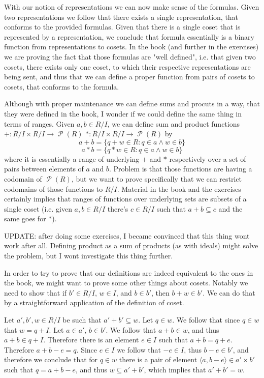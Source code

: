 \documentclass[11pt,oneside,titlepage]{book}
\DeclareMathOperator \pow {\mathcal {P}}
\newcommand{\eangle}[1]{\langle #1 \rangle}
\newcommand{\set}[1]{\{ #1 \}}
\begin{document}
With our notion of representations we can now make sense of the
formulas. Given two representations we follow that there exists a
single representation, that conforms to the provided formulas. Given
that there is a single coset that is represented by a representation,
we conclude that formula essentially is a binary function from
representations to cosets. In the book (and further in the exercises)
we are proving the fact that those formulas are "well defined",
i.e. that given two cosets, there exists only one coset, to which
their respective representations are being sent, and thus that we can
define a proper function from pairs of cosets to cosets, that conforms
to the formula.

Although with proper maintenance we can define sums and procuts
in a way, that they were defined in the book, I wonder if we could
define the same thing in terms of ranges. 
Given $a, b \in R/I$, we can define sum and
product functions $+: R/I \times R/I \to \pow(R)$
$*: R/I \times R/I \to \pow(R)$ by
$$a + b = \set{q + w \in R: q \in a \land w \in b}$$
$$a * b = \set{q * w \in R: q \in a \land w \in b}$$
where it is essentially a range of underlying $+$ and $*$ respectively
over a set of pairs between elements of $a$ and $b$. Problem is that
those functions are having a codomain of $\pow(R)$, but we want to
prove specifically that we can restrict codomains of those functions
to $R/I$. Material in the book and the exercises certainly implies
that ranges of functions over underlying sets are subsets of
a single coset (i.e. given $a, b \in R/I$ there's $c \in R/I$
such that $a + b \subseteq c$ and the same goes for $*$).

UPDATE: after doing some exercises, I became convinced that this thing
wont work after all. Defining product as a sum of products (as with
ideals) might solve the problem, but I wont investigate this thing
further. 

In order to try to prove that our definitions are indeed equivalent to
the ones in the book, we might want to prove some other things about
cosets. Notably we need to show that if $b' \in R/I$, $w \in I$, and
$b \in b'$, then $b + w \in b'$. We can do that by a straightforward
application of the definition of coset.

Let $a', b', w \in R/I$ be such that $a' + b' \subseteq w$. Let $q \in w$.
We follow that since $q \in w$ that $w = q + I$. Let $a \in a'$, $b \in b'$.
We follow that $a + b \in w$, and thus $a + b \in q + I$. Therefore
there is an element $e \in I$ such that $a + b = q + e$. Therefore
$a + b - e = q$. Since $e \in I$ we follow that $-e \in I$, thus
$b - e \in b'$, and therefore we conclude that for $q \in w$ there
is a pair of element $\eangle{a, b - e} \in a' \times b'$ such that
$q = a + b - e$, and thus $w \subseteq a' + b'$, which implies that
$a' + b' = w$.
\end{document}

